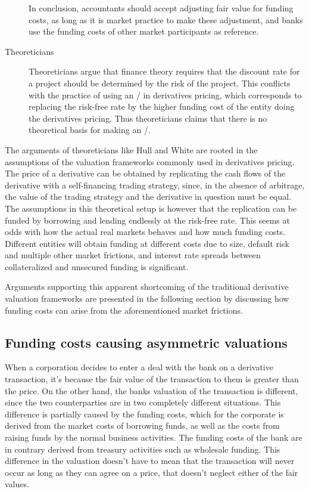 \documentclass[../../../main.tex]{subfiles}
\begin{document}
\begin{description}
            In conclusion, accountants should accept adjusting fair value for funding costs,
            as long as it is market practice to make these adjustment,
            and banks use the funding costs of other market participants as reference.

            \item[Theoreticians]
            Theoreticians argue that finance theory requires that the discount rate for a project should be determined by the risk of the project.
            This conflicts with the practice of using an \FVA/ in derivatives pricing,
            which corresponds to replacing the risk-free rate by the higher funding cost of the entity doing the derivatives pricing.
            Thus theoreticians claims that there is no theoretical basis for making an \FVA/.
        \end{description}

        The arguments of theoreticians like Hull and White are rooted in the assumptions of the valuation frameworks commonly used in derivatives pricing.
        The price of a derivative can be obtained by replicating the cash flows of the derivative with a self-financing trading strategy, 
        since, in the absence of arbitrage, the value of the trading strategy and the derivative in question must be equal.
        The assumptions in this theoretical setup is however 
        that the replication can be funded by borrowing and lending endlessly at the risk-free rate.
        This seems at odds with how the actual real markets behaves and how much funding costs.
        Different entities will obtain funding at different costs due to size,
        default risk and multiple other market frictions,
        and interest rate spreads between collateralized and unsecured funding is significant.

        Arguments supporting this apparent shortcoming of the traditional derivative valuation frameworks are presented in the following section by discussing how funding costs can arise from the aforementioned market frictions.
    
    \subsection{Funding costs causing asymmetric valuations}
        When a corporation decides to enter a deal with the bank on a derivative transaction,
        it's because the fair value of the transaction to them is greater than the price.
        On the other hand, the banks valuation of the transaction is different,
        since the two counterparties are in two completely different situations.
        This difference is partially caused by the funding costs,
        which for the corporate is derived from the market costs of borrowing funds,
        as well as the costs from raising funds by the normal business activities.
        The funding costs of the bank are in contrary derived from treasury activities such as wholesale funding.
        This difference in the valuation doesn't have to mean that the transaction will never occur 
        as long as they can agree on a price, that doesn't neglect either of the fair values.
\end{document}
